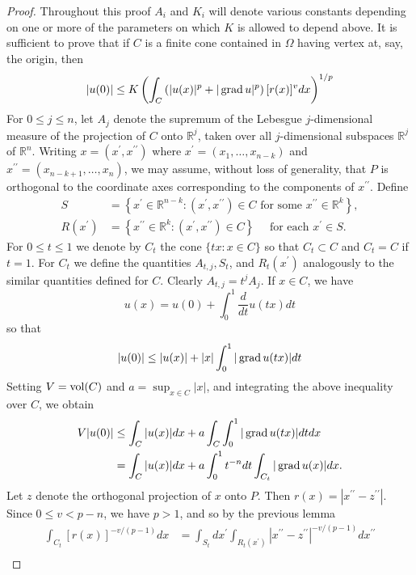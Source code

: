 \begin{proof}
  Throughout this proof $A_i$ and $K_i$ will denote various constants depending on one or more of the parameters on which $K$ is allowed to depend above. It is
  sufficient to prove that if $C$ is a finite cone contained in $\Omega$ having vertex at, say, the origin, then
  \[
  |u(0)| \leq K\left(\int_C\left(|u(x)|^p+|\operatorname{grad} u|^p\right)[r(x)]^v d x\right)^{1 / p}
  \]
  For $0 \leq j \leq n$, let $A_j$ denote the supremum of the Lebesgue $j$-dimensional measure of the projection of $C$ onto $\mathbb{R}^j$, taken over all $j$-dimensional subspaces $\mathbb{R}^j$ of $\mathbb{R}^n$. Writing $x=\left(x^{\prime}, x^{\prime \prime}\right)$ where $x^{\prime}=\left(x_1, \ldots, x_{n-k}\right)$ and $x^{\prime \prime}=\left(x_{n-k+1}, \ldots, x_n\right)$, we may assume, without loss of generality, that $P$ is orthogonal to the coordinate axes corresponding to the components of $x^{\prime \prime}$. Define
  \[
  \begin{aligned}
  S & =\left\{x^{\prime} \in \mathbb{R}^{n-k}:\left(x^{\prime}, x^{\prime \prime}\right) \in C \text { for some } x^{\prime \prime} \in \mathbb{R}^k\right\}, \\
  R\left(x^{\prime}\right) & =\left\{x^{\prime \prime} \in \mathbb{R}^k:\left(x^{\prime}, x^{\prime \prime}\right) \in C\right\} \quad \text { for each } x^{\prime} \in S .
  \end{aligned}
  \]
  For $0 \leq t \leq 1$ we denote by $C_t$ the cone $\{t x: x \in C\}$ so that $C_t \subset C$ and $C_t=C$ if $t=1$. For $C_t$ we define the quantities $A_{t, j}, S_t$, and $R_t\left(x^{\prime}\right)$ analogously to the similar quantities defined for $C$. Clearly $A_{t, j}=t^j A_j$. If $x \in C$, we have
  \[
  u(x)=u(0)+\int_0^1 \frac{d}{d t} u(t x) d t
  \]
  so that
  \[
  |u(0)| \leq|u(x)|+|x| \int_0^1|\operatorname{grad} u(t x)| d t
  \]
  Setting $V=\operatorname{vol}(C)$ and $a=\sup _{x \in C}|x|$, and integrating the above inequality over $C$, we obtain
  \[
  \begin{aligned}
  V|u(0)| & \leq \int_C|u(x)| d x+a \int_C \int_0^1|\operatorname{grad} u(t x)| d t d x \\
  & =\int_C|u(x)| d x+a \int_0^1 t^{-n} d t \int_{C_t}|\operatorname{grad} u(x)| d x .
  \end{aligned}
  \]
  Let $z$ denote the orthogonal projection of $x$ onto $P$. Then $r(x)=\left|x^{\prime \prime}-z^{\prime \prime}\right|$. Since $0 \leq v<p-n$, we have $p>1$, and so by the previous lemma
  \[
  \begin{aligned}
  \int_{C_t}[r(x)]^{-v /(p-1)} d x & =\int_{S_t} d x^{\prime} \int_{R_t\left(x^{\prime}\right)}\left|x^{\prime \prime}-z^{\prime \prime}\right|^{-v /(p-1)} d x^{\prime \prime} \\

\end{aligned}\]
\end{proof}
